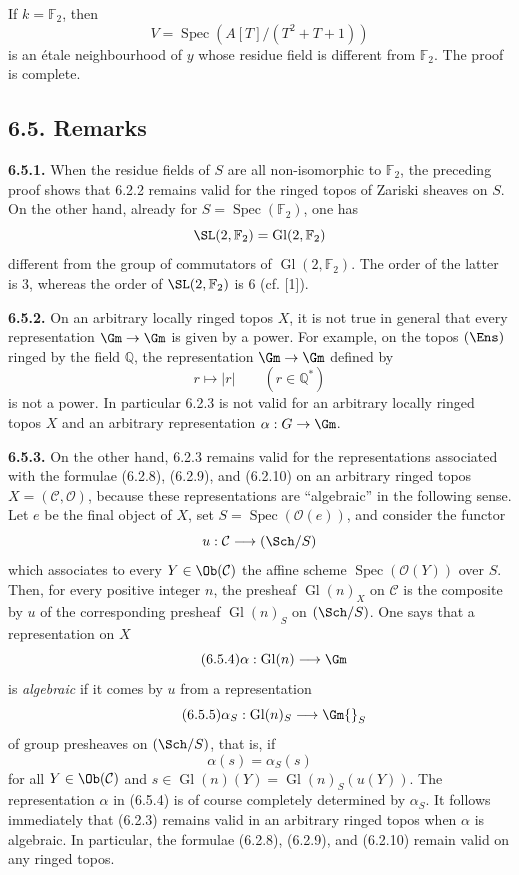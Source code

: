 \documentclass[11pt]{article}
\newcommand{\Spec}{\operatorname{Spec}}
\providecommand{\Gl}{\operatorname{Gl}}
\begin{document}
If \(k=\mathbb F_2\), then
\[
 V=\Spec(A[T]/(T^2+T+1))
\]
is an étale neighbourhood of \(y\) whose residue field is different from \(\mathbb F_2\). The proof is complete.

\subsection*{6.5. Remarks}
\textbf{6.5.1.} When the residue fields of \(S\) are all non-isomorphic to \(\mathbb F_2\), the preceding proof shows that 6.2.2 remains valid for the ringed topos of Zariski sheaves on \(S\). On the other hand, already for \(S=\Spec(\mathbb F_2)\), one has
\[
 \SL(2,\mathbb F_2)=\Gl(2,\mathbb F_2)
\]
different from the group of commutators of \(\Gl(2,\mathbb F_2)\). The order of the latter is \(3\), whereas the order of \(\SL(2,\mathbb F_2)\) is \(6\) (cf. [1]).

\textbf{6.5.2.} On an arbitrary locally ringed topos \(X\), it is not true in general that every representation \(\Gm\to\Gm\) is given by a power. For example, on the topos \((\Ens)\) ringed by the field \(\mathbb Q\), the representation \(\Gm\to\Gm\) defined by
\[
 r\longmapsto |r|\qquad (r\in\mathbb Q^*)
\]
is not a power. In particular 6.2.3 is not valid for an arbitrary locally ringed topos \(X\) and an arbitrary representation \(\alpha:G\to\Gm\).

\textbf{6.5.3.} On the other hand, 6.2.3 remains valid for the representations associated with the formulae (6.2.8), (6.2.9), and (6.2.10) on an arbitrary ringed topos \(X=(\mathcal C,\mathcal O)\), because these representations are ``algebraic'' in the following sense. Let \(e\) be the final object of \(X\), set \(S=\Spec(\mathcal O(e))\), and consider the functor
\[
 u:\mathcal C\longrightarrow(\Sch/S)
\]
which associates to every \(Y\in\Ob(\mathcal C)\) the affine scheme \(\Spec(\mathcal O(Y))\) over \(S\). Then, for every positive integer \(n\), the presheaf \(\Gl(n)_X\) on \(\mathcal C\) is the composite by \(u\) of the corresponding presheaf \(\Gl(n)_S\) on \((\Sch/S)\). One says that a representation on \(X\)
\begin{equation}\tag{6.5.4}
 \alpha:\Gl(n)\longrightarrow\Gm
\end{equation}
is \emph{algebraic} if it comes by \(u\) from a representation
\begin{equation}\tag{6.5.5}
 \alpha_S:\Gl(n)_S\longrightarrow\Gm{}_{S}
\end{equation}
of group presheaves on \((\Sch/S)\), that is, if
\[
 \alpha(s)=\alpha_S(s)
\]
for all \(Y\in\Ob(\mathcal C)\) and \(s\in\Gl(n)(Y)=\Gl(n)_S(u(Y))\). The representation \(\alpha\) in (6.5.4) is of course completely determined by \(\alpha_S\). It follows immediately that (6.2.3) remains valid in an arbitrary ringed topos when \(\alpha\) is algebraic. In particular, the formulae (6.2.8), (6.2.9), and (6.2.10) remain valid on any ringed topos.
\end{document}
